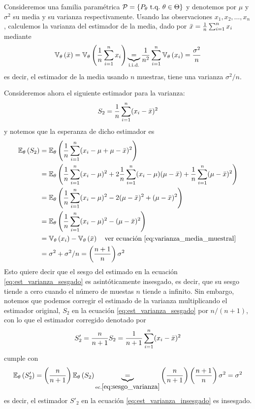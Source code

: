 \begin{example}
Consideremos una familia paramétrica $\mathcal{P} = \{P_\theta\ {\text{t.q.}}\ \theta\in\Theta\}$ y denotemos por $\mu$ y $\sigma^2$ su media y su varianza respectivamente. Usando las observaciones $x_1,x_2,\ldots,x_n$, calculemos la varianza del estimador de la media, dado por ${ \bar{x}} = \frac{1}{n}\sum_{i=1}^n x_i$ mediante
\begin{equation}
	\label{eq:varianza_media_muestral}
 	\mathbb{V}_\theta \left({ \bar{x}}\right) = \mathbb{V}_\theta \left(\frac{1}{n}	\sum_{i=1}^n x_i\right)  \underbrace{=}_{\text{i.i.d.}}  \frac{1}{n^2}	\sum_{i=1}^n\mathbb{V}_\theta \left( x_i\right) =\frac{\sigma^2}{n}
 \end{equation} 
 es decir, el estimador de la media usando $n$ muestras, tiene una varianza $\sigma^2/n$.

 Consideremos ahora el siguiente estimador para la varianza: 
\begin{equation}
	\label{eq:est_varianza_sesgado}
	S_2 = \frac{1}{n}\sum_{i=1}^n (x_i-{ \bar{x}})^2
\end{equation}
y notemos que la esperanza de dicho estimador es
\begin{align}
	\label{eq:sesgo_varianza}
	\mathbb{E}_\theta \left(S_2 \right) &= \mathbb{E}_\theta \left(\frac{1}{n}\sum_{i=1}^n (x_i-\mu+\mu-{ \bar{x}})^2\right)\nonumber\\
				&= \mathbb{E}_\theta \left( \frac{1}{n}\sum_{i=1}^n(x_i-\mu)^2 + 2\frac{1}{n}\sum_{i=1}^n(x_i-\mu)(\mu-{ \bar{x}}) + \frac{1}{n}\sum_{i=1}^n(\mu-{ \bar{x}})^2\right)\nonumber\\
				&= \mathbb{E}_\theta \left( \frac{1}{n}\sum_{i=1}^n(x_i-\mu)^2 - 2(\mu-{ \bar{x}})^2 + (\mu-{ \bar{x}})^2\right)\nonumber\\
				&= \mathbb{E}_\theta \left( \frac{1}{n}\sum_{i=1}^n(x_i-\mu)^2 - (\mu-{ \bar{x}})^2\right)\nonumber\\
				&= \mathbb{V}_\theta \left(x_i\right) - \mathbb{V}_\theta \left({ \bar{x}}\right)\quad\text{ver ecuación \eqref{eq:varianza_media_muestral}}\nonumber\\
				&= 	\sigma^2 + \sigma^2/n = \left(\frac{n+1}{n}\right)\sigma^2
\end{align}
Esto quiere decir que el sesgo del estimado en la ecuación \eqref{eq:est_varianza_sesgado} es asintóticamente insesgado, es decir, que su sesgo tiende a cero cuando el número de muestas $n$ tiende a infinito. Sin embargo, notemos que podemos corregir el estimado de la varianza multiplicando el estimador original, $S_2$ en la ecuación \eqref{eq:est_varianza_sesgado} por $n/(n+1)$, con lo que el estimador corregido denotado por 
\begin{equation}
	\label{eq:est_varianza_insesgado}
	S'_2 = \frac{n}{n+1}S_2 =  \frac{1}{n+1}\sum_{i=1}^n (x_i-{ \bar{x}})^2
\end{equation}
cumple con
\begin{equation}
	\mathbb{E}_\theta \left(S'_2 \right) =  \left(\frac{n}{n+1}\right)\mathbb{E}_\theta \left(S_2\right) \underbrace{=}_{\text{ec.}\eqref{eq:sesgo_varianza}} \left(\frac{n}{n+1}\right) \left(\frac{n+1}{n}\right)\sigma^2 = \sigma^2
\end{equation}
es decir, el estimador $S'_2$ en la ecuación \eqref{eq:est_varianza_insesgado} es insesgado.
\end{example}

